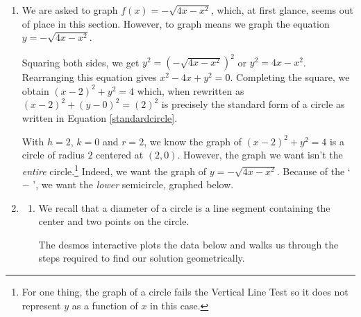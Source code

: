 \documentclass{ximera}
\begin{document}
\begin{example}
\begin{explanation}
\begin{enumerate}
\begin{enumerate}
\begin{image}
\end{image}

\end{enumerate}

\item  We are asked to graph $f(x) = - \sqrt{4x-x^2}$, which, at first glance, seems out of place in this section. However, to graph means we graph the equation  $y = -\sqrt{4x-x^2}$.  


Squaring both sides, we get  $y^2 = (-\sqrt{4x-x^2})^2$ or   $y^2 = 4x - x^2$.  Rearranging this equation gives $x^2-4x+y^2 = 0$.   Completing the square, we obtain $(x-2)^2 + y^2  = 4$ which, when rewritten as $(x-2)^2 + (y-0)^2 = (2)^2$ is precisely the standard form of a circle as written in Equation \ref{standardcircle}.  


With $h = 2$, $k=0$ and $r=2$, we know the graph of   $(x-2)^2 + y^2  = 4$ is a circle of radius $2$ centered at $(2,0)$.  However,  the graph we want isn't the \textit{entire} circle.\footnote{For one thing, the graph of a circle fails the Vertical Line Test so it does not represent $y$ as a function of $x$ in this case.}  Indeed, we want the graph of $y = -\sqrt{4x-x^2}$. Because of the `$-$ ',  we want the \textit{lower} semicircle, graphed below.

\begin{center}
\end{center}
   

\item 

\begin{enumerate}

\item  We recall that a diameter of a circle is a line segment containing the center and two points on the circle.


The desmos interactive plots the data below and walks us through the steps required to find our solution geometrically.



\end{enumerate}
\end{enumerate}
\end{explanation}
\end{example}
\end{document}
